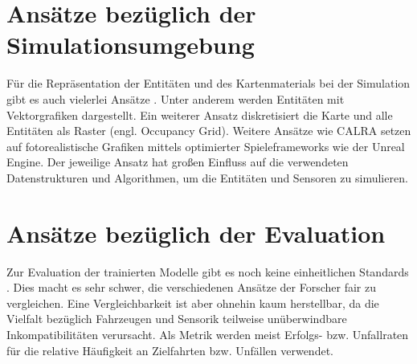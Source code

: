 \section{Ansätze bezüglich der Simulationsumgebung}
Für die Repräsentation der Entitäten und des Kartenmaterials bei der Simulation gibt es auch
vielerlei Ansätze \cite{Kiran2022survey}. Unter anderem werden Entitäten mit Vektorgrafiken
dargestellt. Ein weiterer Ansatz diskretisiert die Karte und alle Entitäten als Raster
(engl. Occupancy Grid). Weitere Ansätze wie CALRA \cite{dosovitskiy2017carla} setzen auf
fotorealistische Grafiken mittels optimierter Spieleframeworks wie der Unreal Engine.
Der jeweilige Ansatz hat großen Einfluss auf die verwendeten Datenstrukturen und
Algorithmen, um die Entitäten und Sensoren zu simulieren.

\section{Ansätze bezüglich der Evaluation}
Zur Evaluation der trainierten Modelle gibt es noch keine einheitlichen Standards
\cite{Kiran2022survey}. Dies macht es sehr schwer, die verschiedenen Ansätze der Forscher
fair zu vergleichen. Eine Vergleichbarkeit ist aber ohnehin kaum herstellbar, da die
Vielfalt bezüglich Fahrzeugen und Sensorik teilweise unüberwindbare Inkompatibilitäten
verursacht. Als Metrik werden meist Erfolgs- bzw. Unfallraten für die relative Häufigkeit
an Zielfahrten bzw. Unfällen verwendet.
